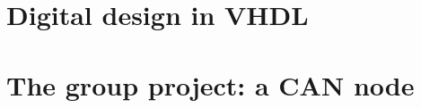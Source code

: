 \documentclass[10pt, twoside, openright]{book}
\begin{document}
\frontmatter

\tableofcontents


\mainmatter
\part{Digital design in VHDL}
\label{part:vhdl}










\part{The group project: a CAN node}
\label{part:can}












\appendix
{}





\end{document}

